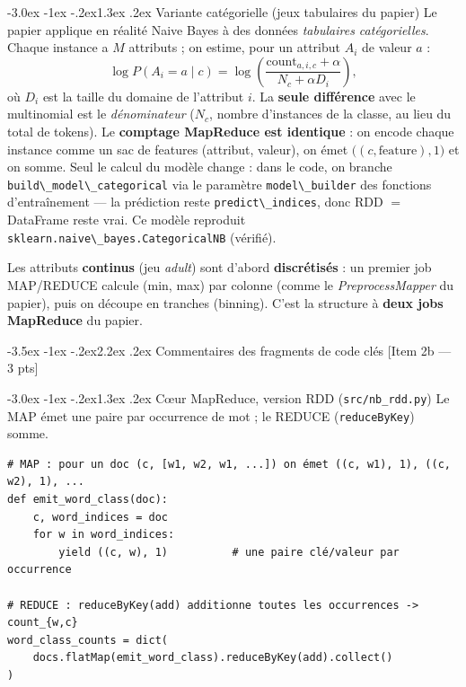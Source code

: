\documentclass[11pt,a4paper]{article}
\makeatletter
\newcommand{\code}[1]{\lstinline[style=py]!#1!}
\renewcommand\section{\@startsection{section}{1}{\z@}%
  {-3.5ex \@plus -1ex \@minus -.2ex}{2.2ex \@plus.2ex}%
  {\normalfont\Large\bfseries\color{primary}}}
\renewcommand\subsection{\@startsection{subsection}{2}{\z@}%
  {-3.0ex \@plus -1ex \@minus -.2ex}{1.3ex \@plus.2ex}%
  {\normalfont\large\bfseries\color{primary!88!black}}}
\makeatother
\begin{document}
\subsection{Variante catégorielle (jeux tabulaires du papier)}
\label{sec:categorical}
Le papier applique en réalité Naive Bayes à des données \emph{tabulaires catégorielles}.
Chaque instance a $M$ attributs ; on estime, pour un attribut $A_i$ de valeur $a$ :
\begin{equation}
  \log P(A_i = a \mid c) = \log\!\left( \frac{\mathrm{count}_{a,i,c} + \alpha}{N_c + \alpha D_i} \right),
\end{equation}
où $D_i$ est la taille du domaine de l'attribut $i$. La \textbf{seule différence} avec le
multinomial est le \emph{dénominateur} ($N_c$, nombre d'instances de la classe, au lieu du
total de tokens). Le \textbf{comptage MapReduce est identique} : on encode chaque instance
comme un sac de features (attribut, valeur), on émet $\big((c, \text{feature}), 1\big)$ et on
somme. Seul le calcul du modèle change : dans le code, on branche
\code{build\_model\_categorical} via le paramètre \code{model\_builder} des fonctions
d'entraînement --- la prédiction reste \code{predict\_indices}, donc RDD $=$ DataFrame reste
vrai. Ce modèle reproduit \code{sklearn.naive\_bayes.CategoricalNB} (vérifié).

Les attributs \textbf{continus} (jeu \emph{adult}) sont d'abord \textbf{discrétisés} : un
premier job MAP/REDUCE calcule (min, max) par colonne (comme le \emph{PreprocessMapper} du
papier), puis on découpe en tranches (binning). C'est la structure à \textbf{deux jobs
MapReduce} du papier.

\section{Commentaires des fragments de code clés \hfill\normalsize\textmd{[Item 2b --- 3 pts]}}
\label{sec:fragments}

\subsection{Cœur MapReduce, version RDD (\texttt{src/nb\_rdd.py})}
Le MAP émet une paire par occurrence de mot ; le REDUCE (\code{reduceByKey}) somme.
\begin{lstlisting}[style=py]
# MAP : pour un doc (c, [w1, w2, w1, ...]) on émet ((c, w1), 1), ((c, w2), 1), ...
def emit_word_class(doc):
    c, word_indices = doc
    for w in word_indices:
        yield ((c, w), 1)          # une paire clé/valeur par occurrence

# REDUCE : reduceByKey(add) additionne toutes les occurrences -> count_{w,c}
word_class_counts = dict(
    docs.flatMap(emit_word_class).reduceByKey(add).collect()
)
\end{lstlisting}
\end{document}
